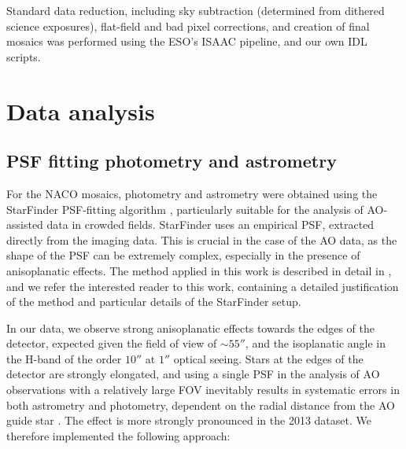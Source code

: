 \documentclass[a4paper,fleqn,usenatbib]{mnras}
\begin{document}
Standard data reduction, including sky subtraction (determined from dithered science exposures), 
flat-field and bad pixel corrections, and creation of final mosaics was performed using the ESO's ISAAC pipeline, 
and our own {\sc IDL} scripts. 

\section{Data analysis}
\label{analysis}

\subsection{PSF fitting photometry and astrometry}
\label{psf_fit}
For the NACO mosaics, photometry and astrometry were obtained using the {\sc StarFinder} PSF-fitting
algorithm \citep{diolaiti00}, particularly suitable for the analysis of AO-assisted data in crowded fields.
{\sc StarFinder}  uses an empirical PSF, extracted directly from the imaging data. This is crucial in the case of the AO data, as
the shape of the PSF can be extremely complex, especially in the presence of anisoplanatic effects. The method applied in this work is 
described in 
detail in \citet{schoedel10}, and we refer the interested reader to this work, containing a detailed justification of the method and 
particular details of the {\sc StarFinder} setup.

In our data, we observe strong anisoplanatic effects towards the edges of the detector, expected given the field of view of $\sim 55''$, and 
the isoplanatic angle in the H-band of the order $10''$ at $1''$ optical seeing. Stars at the edges of the detector are strongly elongated, and  
using a single PSF in the analysis of AO observations
with a relatively large FOV inevitably results in systematic errors in both astrometry and photometry, dependent on the radial
distance from the AO guide star \citep{schoedel10}. The effect is more strongly pronounced in the 2013 dataset. We therefore implemented the following approach:
\end{document}
